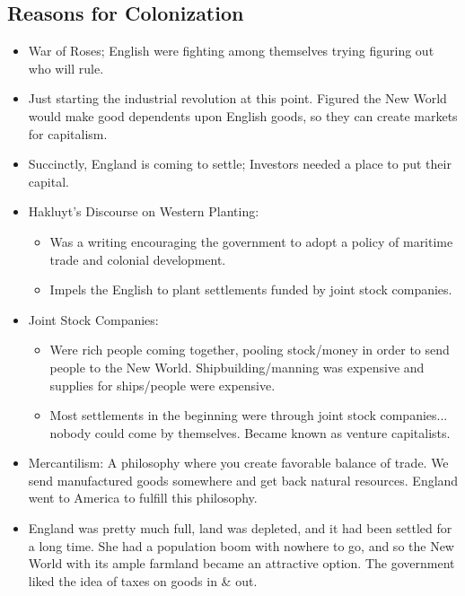 \documentclass{article}
\begin{document}
    \subsection{Reasons for Colonization}
      \begin{itemize}
        \item War of Roses; English were fighting among themselves trying figuring out who will rule.
        \item Just starting the industrial revolution at this point. Figured the New World would make good dependents upon English goods, so they can create markets for capitalism.
        \item Succinctly, England is coming to settle; Investors needed a place to put their capital.
        \item Hakluyt's Discourse on Western Planting:
          \begin{itemize}
            \item Was a writing encouraging the government to adopt a policy of maritime trade and colonial development.
            \item Impels the English to plant settlements funded by joint stock companies.
          \end{itemize}
        \item Joint Stock Companies:
          \begin{itemize}
            \item Were rich people coming together, pooling stock/money in order to send people to the New World. Shipbuilding/manning was expensive and supplies for ships/people were expensive.
            \item Most settlements in the beginning were through joint stock companies... nobody could come by themselves. Became known as venture capitalists.
          \end{itemize}
        \item Mercantilism: A philosophy where you create favorable balance of trade. We send manufactured goods somewhere and get back natural resources. England went to America to fulfill this philosophy.
        \item England was pretty much full, land was depleted, and it had been settled for a long time. She had a population boom with nowhere to go, and so the New World with its ample farmland became an attractive option. The government liked the idea of taxes on goods in \& out.
      \end{itemize}
\end{document}
